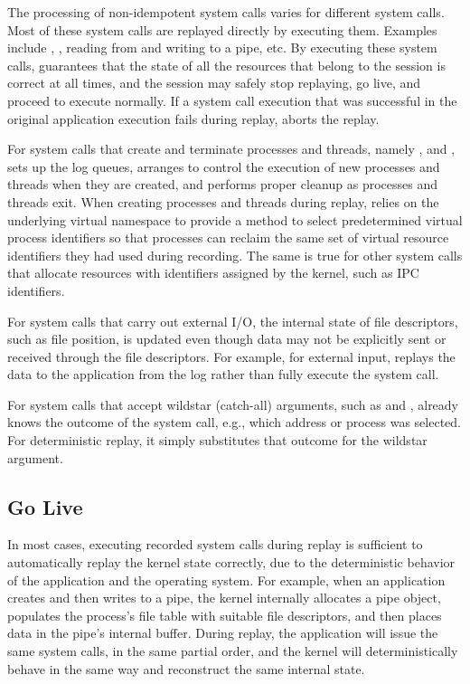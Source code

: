 \begin{table}[]
The processing of non-idempotent system calls varies for 
different system calls.  Most of these system calls are replayed
directly by executing them. Examples include ,
, reading from and writing to a pipe, etc.  By executing
these system calls, \scribe{} guarantees that the state of all the
resources that belong to the session is correct at all times, and the
session may safely stop replaying, go live, and proceed to execute
normally. If a system call execution that was successful in the
original application execution fails during replay, \scribe{} aborts
the replay. 

  

For system calls that create and terminate processes and threads,
namely ,  and , \scribe{} sets up
the log queues, arranges to control the execution of new processes
and threads when they are created, and performs proper cleanup as
processes and threads exit. When creating processes and threads during
replay, \scribe{} relies on the underlying virtual namespace
to provide a method to select predetermined virtual process
identifiers so that processes can reclaim the same set of virtual
resource identifiers they had used during recording.  The same is true
for other system calls that allocate resources with identifiers
assigned by the kernel, such as IPC identifiers.

For system calls that carry out external I/O, the internal state of
file descriptors, such as file position, is updated even though data
may not be explicitly sent or received through the file descriptors. 
For example, for external input, \scribe{} replays the data to the
application from the log rather than fully execute the 
system call.  

For system calls that accept wildstar (catch-all) arguments,
such as  and , \scribe{} already knows the
outcome of the system call, e.g., which address or process was
selected. For deterministic replay, it simply substitutes
that outcome for the wildstar argument.

    

\subsection{Go Live}
\label{scribe:sec:golive}

In most cases, executing recorded system calls during replay is
sufficient to automatically replay the kernel state correctly, due to
the deterministic behavior of the application and the operating
system. For example, when an application creates and then writes to a
pipe, the kernel internally allocates a pipe object, populates the
process's file table with suitable file descriptors, and then places
data in the pipe's internal buffer. During replay, the application
will issue the same system calls, in the same partial order, and the
kernel will deterministically behave in the same way and reconstruct
the same internal state.


\end{table}
